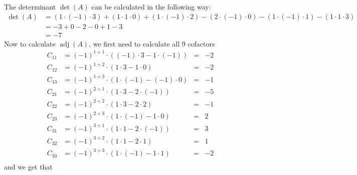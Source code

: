 \documentclass{article}
\DeclareMathOperator{\adj}{adj}
\begin{document}
\begin{enumerate}
{\begin{enumerate}
{                    The determinant \(\det(A)\) can be calculated in the following way:
                    \begin{displaymath}
                        \begin{aligned}
                            \det(A) &= 
                            (1 \cdot (-1) \cdot 3) +
                            (1 \cdot 1 \cdot 0) +
                            (1 \cdot (-1) \cdot 2) -
                            (2 \cdot (-1) \cdot 0) -
                            (1 \cdot (-1) \cdot 1) -
                            (1 \cdot 1 \cdot 3) \\
                            &= -3 + 0 - 2 - 0 + 1 - 3 \\
                            &= -7
                        \end{aligned}
                    \end{displaymath}
                    Now to calculate \(\adj(A)\), we first need to calculate all 9 cofactors
                    \begin{displaymath}
                        \begin{aligned}
                            C_{11} &= (-1)^{1+1} \cdot \left((-1)\cdot3 - 1\cdot(-1)\right) &=& -2 \\
                            C_{12} &= (-1)^{1+2} \cdot \left(1\cdot3 - 1\cdot0\right) &=& -2 \\
                            C_{13} &= (-1)^{1+3} \cdot \left(1\cdot(-1) - (-1)\cdot0\right) &=& -1 \\
                            C_{21} &= (-1)^{2+1} \cdot \left(1\cdot3 - 2\cdot(-1)\right) &=& -5 \\
                            C_{22} &= (-1)^{2+2} \cdot \left(1\cdot3 - 2\cdot2\right) &=& -1 \\
                            C_{23} &= (-1)^{2+3} \cdot \left(1\cdot(-1) - 1\cdot0\right) &=& 2 \\
                            C_{31} &= (-1)^{3+1} \cdot \left(1\cdot1 - 2\cdot(-1)\right) &=& 3 \\
                            C_{32} &= (-1)^{3+2} \cdot \left(1\cdot1 - 2\cdot1\right) &=& 1 \\
                            C_{33} &= (-1)^{3+3} \cdot \left(1\cdot(-1) - 1\cdot1\right) &=& -2 \\
                        \end{aligned}
                    \end{displaymath}
                    and we get that
}
\end{enumerate}}
\end{enumerate}
\end{document}
